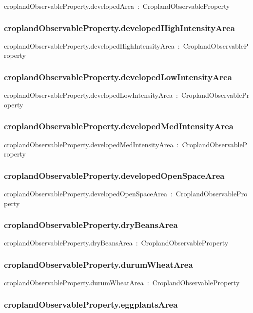 \documentclass{article}
\begin{document}
croplandObservableProperty.developedArea~:~CroplandObservableProperty

\subsubsection*{croplandObservableProperty.developedHighIntensityArea}

croplandObservableProperty.developedHighIntensityArea~:~CroplandObservableProperty

\subsubsection*{croplandObservableProperty.developedLowIntensityArea}

croplandObservableProperty.developedLowIntensityArea~:~CroplandObservableProperty

\subsubsection*{croplandObservableProperty.developedMedIntensityArea}

croplandObservableProperty.developedMedIntensityArea~:~CroplandObservableProperty

\subsubsection*{croplandObservableProperty.developedOpenSpaceArea}

croplandObservableProperty.developedOpenSpaceArea~:~CroplandObservableProperty

\subsubsection*{croplandObservableProperty.dryBeansArea}

croplandObservableProperty.dryBeansArea~:~CroplandObservableProperty

\subsubsection*{croplandObservableProperty.durumWheatArea}

croplandObservableProperty.durumWheatArea~:~CroplandObservableProperty

\subsubsection*{croplandObservableProperty.eggplantsArea}
\end{document}
